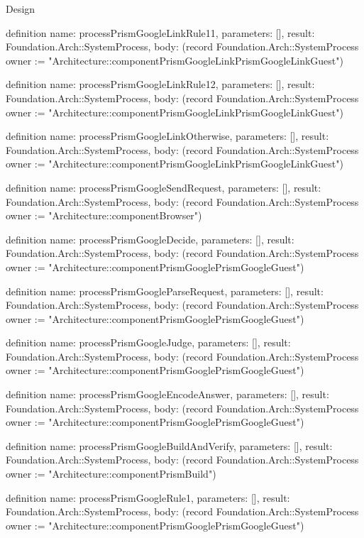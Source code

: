 \begin{lexlean}{Design}
\begin{semanticmodule}
definition{
  name: processPrismGoogleLinkRule11,
  parameters: [],
  result: Foundation.Arch::SystemProcess,
  body: (record Foundation.Arch::SystemProcess {owner := "Architecture::componentPrismGoogleLinkPrismGoogleLinkGuest"})
}

definition{
  name: processPrismGoogleLinkRule12,
  parameters: [],
  result: Foundation.Arch::SystemProcess,
  body: (record Foundation.Arch::SystemProcess {owner := "Architecture::componentPrismGoogleLinkPrismGoogleLinkGuest"})
}

definition{
  name: processPrismGoogleLinkOtherwise,
  parameters: [],
  result: Foundation.Arch::SystemProcess,
  body: (record Foundation.Arch::SystemProcess {owner := "Architecture::componentPrismGoogleLinkPrismGoogleLinkGuest"})
}

definition{
  name: processPrismGoogleSendRequest,
  parameters: [],
  result: Foundation.Arch::SystemProcess,
  body: (record Foundation.Arch::SystemProcess {owner := "Architecture::componentBrowser"})
}

definition{
  name: processPrismGoogleDecide,
  parameters: [],
  result: Foundation.Arch::SystemProcess,
  body: (record Foundation.Arch::SystemProcess {owner := "Architecture::componentPrismGooglePrismGoogleGuest"})
}

definition{
  name: processPrismGoogleParseRequest,
  parameters: [],
  result: Foundation.Arch::SystemProcess,
  body: (record Foundation.Arch::SystemProcess {owner := "Architecture::componentPrismGooglePrismGoogleGuest"})
}

definition{
  name: processPrismGoogleJudge,
  parameters: [],
  result: Foundation.Arch::SystemProcess,
  body: (record Foundation.Arch::SystemProcess {owner := "Architecture::componentPrismGooglePrismGoogleGuest"})
}

definition{
  name: processPrismGoogleEncodeAnswer,
  parameters: [],
  result: Foundation.Arch::SystemProcess,
  body: (record Foundation.Arch::SystemProcess {owner := "Architecture::componentPrismGooglePrismGoogleGuest"})
}

definition{
  name: processPrismGoogleBuildAndVerify,
  parameters: [],
  result: Foundation.Arch::SystemProcess,
  body: (record Foundation.Arch::SystemProcess {owner := "Architecture::componentPrismBuild"})
}

definition{
  name: processPrismGoogleRule1,
  parameters: [],
  result: Foundation.Arch::SystemProcess,
  body: (record Foundation.Arch::SystemProcess {owner := "Architecture::componentPrismGooglePrismGoogleGuest"})
}


\end{semanticmodule}
\end{lexlean}
